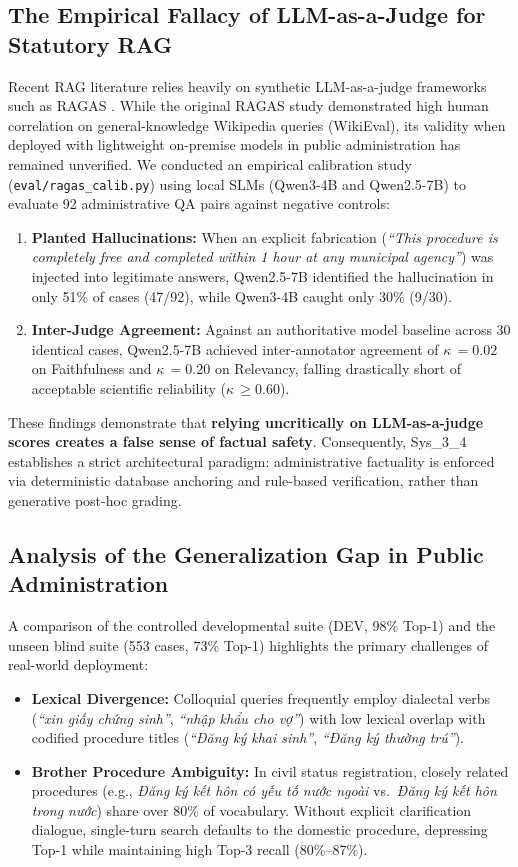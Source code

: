 \documentclass[11pt,a4paper]{article}
\newcommand{\sys}{\mbox{Sys\_3\_4}}
\newcommand{\kpa}{$\kappa$}
\begin{document}
\subsection{The Empirical Fallacy of LLM-as-a-Judge for Statutory RAG}
Recent RAG literature relies heavily on synthetic LLM-as-a-judge frameworks such as RAGAS \cite{ragas}.
While the original RAGAS study demonstrated high human correlation on general-knowledge Wikipedia
queries (WikiEval), its validity when deployed with lightweight on-premise models in public
administration has remained unverified. We conducted an empirical calibration study
(\texttt{eval/ragas\_calib.py}) using local SLMs (Qwen3-4B and Qwen2.5-7B) to evaluate 92 administrative
QA pairs against negative controls:
\begin{enumerate}[label=\arabic*.]
\item \textbf{Planted Hallucinations:} When an explicit fabrication (\emph{``This procedure is completely
free and completed within 1 hour at any municipal agency''}) was injected into legitimate answers,
Qwen2.5-7B identified the hallucination in only 51\% of cases (47/92), while Qwen3-4B caught only 30\%
(9/30).
\item \textbf{Inter-Judge Agreement:} Against an authoritative model baseline across 30 identical cases,
Qwen2.5-7B achieved inter-annotator agreement of \kpa{}\,$=0.02$ on Faithfulness and \kpa{}\,$=0.20$ on
Relevancy, falling drastically short of acceptable scientific reliability (\kpa{}\,$\ge 0.60$).
\end{enumerate}
These findings demonstrate that \textbf{relying uncritically on LLM-as-a-judge scores creates a false
sense of factual safety}. Consequently, \sys{} establishes a strict architectural paradigm:
administrative factuality is enforced via deterministic database anchoring and rule-based verification,
rather than generative post-hoc grading.

\subsection{Analysis of the Generalization Gap in Public Administration}
A comparison of the controlled developmental suite (DEV, 98\% Top-1) and the unseen blind suite (553
cases, 73\% Top-1) highlights the primary challenges of real-world deployment:
\begin{itemize}
\item \textbf{Lexical Divergence:} Colloquial queries frequently employ dialectal verbs (\emph{``xin giấy
chứng sinh''}, \emph{``nhập khẩu cho vợ''}) with low lexical overlap with codified procedure titles
(\emph{``Đăng ký khai sinh''}, \emph{``Đăng ký thường trú''}).
\item \textbf{Brother Procedure Ambiguity:} In civil status registration, closely related procedures
(e.g., \emph{Đăng ký kết hôn có yếu tố nước ngoài} vs.\ \emph{Đăng ký kết hôn trong nước}) share over
80\% of vocabulary. Without explicit clarification dialogue, single-turn search defaults to the domestic
procedure, depressing Top-1 while maintaining high Top-3 recall (80\%--87\%).
\end{itemize}
\end{document}
